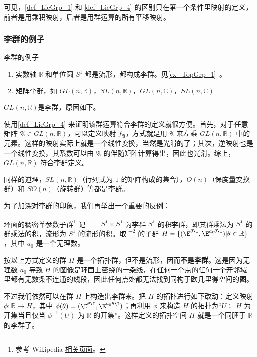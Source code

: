 可见，\autoref{def_LieGrp_1} 和 \autoref{def_LieGrp_4} 的区别只在第一个条件里映射的定义，前者是用乘积映射，后者是用群运算的所有平移映射。

\subsubsection{李群的例子}

\begin{example}{李群的例子}
\begin{enumerate}
\item 实数轴 $\mathbb{R}$ 和单位圆 $S^1$ 都是流形，都构成李群。见\autoref{ex_TopGrp_1}~。
\item 矩阵李群，如 $GL(n, \mathbb{R})$，$SL(n, \mathbb{R})$，$GL(n, \mathbb{C})$，$SL(n, \mathbb{C})$
\end{enumerate}
\end{example}

$GL(n, \mathbb{R})$是李群，原因如下。

使用\autoref{def_LieGrp_4} 来证明该群运算符合李群的定义就很方便。首先，对于任意矩阵 $\mathfrak{A} \in GL(n, \mathbb{R})$，可以定义映射 $f_\mathfrak{A}$，方式就是用 $\mathfrak{A}$ 来左乘 $GL(n, \mathbb{R})$ 中的元素。这样的映射实际上就是一个线性变换，当然是光滑的了；其次，逆映射也是一个线性变换，其系数可以由 $\mathfrak{A}$ 的伴随矩阵计算得出，因此也光滑。综上，$GL(n, \mathbb{R})$ 符合李群定义。

同样的道理，$SL(n, \mathbb{R})$（行列式为 $1$ 的矩阵构成的集合），$O(n)$（保度量变换群）和 $SO(n)$（旋转群）等都是李群。

为了加深对李群的印象，我们再举出一个重要的反例：

\begin{example}{环面的稠密单参数子群\footnote{参考 Wikipedia \href{https://en.wikipedia.org/wiki/Lie_group}{相关页面}。}}\label{ex_LieGrp_1}
记 $\mathbb{T}=S^1\times S^1$ 为李群 $S^1$ 的积李群，即其群乘法为 $S^1$ 的群乘法的积，流形为 $S^1$ 的流形的积。取 $\mathbb{T}^2$ 的子群 $H=\{(\E^{\theta\I}, \E^{a_0\theta\I})|\theta\in\mathbb{R}\}$，其中 $a_0$ 是一个无理数。

按以上方式定义的群 $H$ 是一个拓扑群，但不是流形，因而\textbf{不是李群}。这是因为无理数 $a_0$ 导致 $H$ 的图像是环面上密绕的一条线，在任何一个点的任何一个开邻域里都有无数条不连通的线段，因此任何点处都无法找到同构于欧几里得空间的\textbf{图}。

不过我们依然可以在群 $H$ 上构造出李群来。把 $H$ 的拓扑进行如下改动：定义映射 $\phi:\mathbb{R}\to H$，其中 $\phi(\theta)=(\E^{\theta\I}, \E^{a_0\theta\I})$；再利用 $\phi$ 来构造 $H$ 的拓扑为“$U\subseteq H$ 为开集当且仅当 $\phi^{-1}(U)$ 为 $\mathbb{R}$ 的开集”。这样定义的拓扑空间 $H$ 就是一个同胚于 $\mathbb{R}$ 的李群了。
\end{example}

